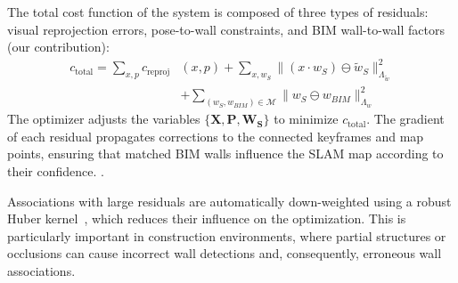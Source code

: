 The total cost function of the system is composed of three types of residuals: visual reprojection errors, pose-to-wall constraints, and BIM wall-to-wall factors (our contribution):
% 
\begin{align}
c_{\text{total}} = \sum_{x,p} c_{\text{reproj}}&(x,p) 
+ \sum_{x,w_{S}} \big\| (x \cdot w_{S}) \ominus \tilde{w}_{S} 
\big\|^2_{\Lambda_{\tilde{w}}} \nonumber \\
&+ \sum_{(w_{S},w_{BIM}) \in \mathcal{M}} 
\big\| w_{S} \ominus w_{BIM} \big\|^2_{\Lambda_{w}}
\end{align}
 The optimizer adjusts 
the variables $\{\mathbf{X},\mathbf{P},\mathbf{W_S}\}$ to minimize 
$c_{\text{total}}$. The gradient of each residual propagates corrections 
to the connected keyframes and map points, ensuring that matched BIM 
walls influence the SLAM map according to their confidence. 
. 

Associations with large residuals are automatically down-weighted using a robust Huber kernel~\cite{GALLEGO2021174}, which reduces their influence on the optimization.  
This is particularly important in construction environments, where partial structures or occlusions can cause incorrect wall detections and, consequently, erroneous wall associations.


